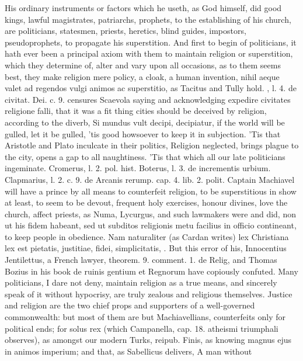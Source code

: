 {His ordinary instruments or factors which he useth, as God himself, did
good kings, lawful magistrates, patriarchs, prophets, to the
establishing of his church, are politicians, statesmen, priests,
heretics, blind guides, impostors, pseudoprophets, to propagate his
superstition. And first to begin of politicians, it hath ever been a
principal axiom with them to maintain religion or superstition, which
they determine of, alter and vary upon all occasions, as to them seems
best, they make religion mere policy, a cloak, a human invention, nihil
aeque valet ad regendos vulgi animos ac superstitio, as Tacitus
and Tully hold. \Austin{}, l. 4. de civitat. Dei. c. 9. censures
Scaevola saying and acknowledging expedire civitates religione falli,
that it was a fit thing cities should be deceived by religion,
according to the diverb, Si mundus vult decipi, decipiatur, if the
world will be gulled, let it be gulled, 'tis good howsoever to keep it
in subjection. 'Tis that Aristotle and Plato inculcate in
their politics, Religion neglected, brings plague to the city, opens a
gap to all naughtiness. 'Tis that which all our late politicians
ingeminate. Cromerus, l. 2. pol. hist. Boterus, l. 3. de incrementis
urbium. Clapmarius, l. 2. c. 9. de Arcanis rerump. cap. 4. lib. 2.
polit. Captain Machiavel will have a prince by all means to counterfeit
religion, to be superstitious in show at least, to seem to be devout,
frequent holy exercises, honour divines, love the church, affect
priests, as Numa, Lycurgus, and such lawmakers were and did, non ut his
fidem habeant, sed ut subditos religionis metu facilius in officio
contineant, to keep people in obedience. Nam naturaliter (as
Cardan writes) lex Christiana lex est pietatis, justitiae, fidei,
simplicitatis, \etc{}. But this error of his, Innocentius Jentilettus, a
French lawyer, theorem. 9. comment. 1. de Relig, and Thomas Bozius in
his book de ruinis gentium et Regnorum have copiously confuted. Many
politicians, I dare not deny, maintain religion as a true means, and
sincerely speak of it without hypocrisy, are truly zealous and
religious themselves. Justice and religion are the two chief props and
supporters of a well-governed commonwealth: but most of them are but
Machiavellians, counterfeits only for political ends; for solus rex
(which Campanella, cap. 18. atheismi triumphali observes), as amongst
our modern Turks, reipub. Finis, as knowing magnus ejus in animos
imperium; and that, as Sabellicus delivers, A man without
}
